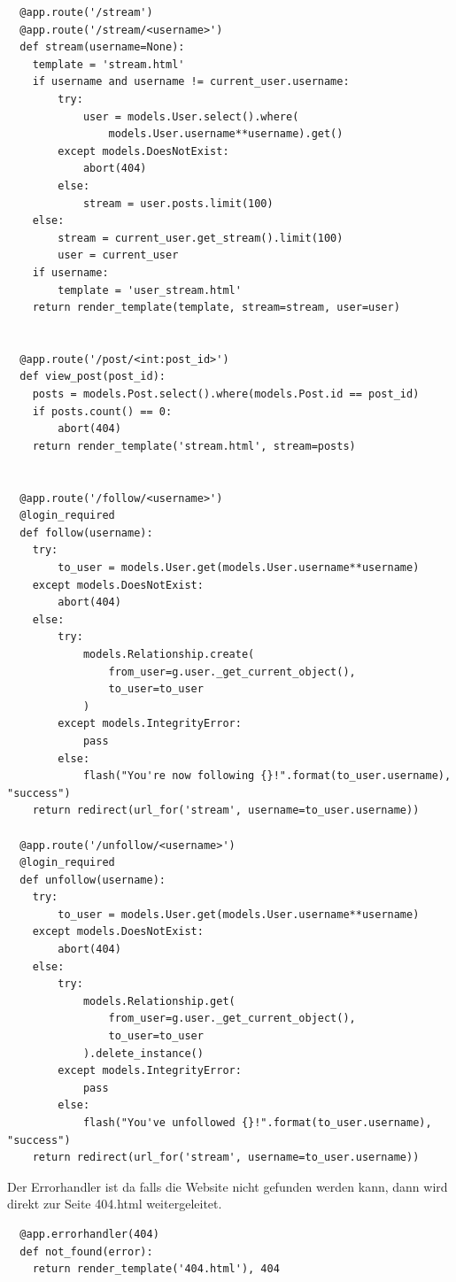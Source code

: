 \documentclass{article}
\begin{document}
\begin{lstlisting}
  @app.route('/stream')
  @app.route('/stream/<username>')
  def stream(username=None):
    template = 'stream.html'
    if username and username != current_user.username:
        try:
            user = models.User.select().where(
                models.User.username**username).get()
        except models.DoesNotExist:
            abort(404)
        else:
            stream = user.posts.limit(100)
    else:
        stream = current_user.get_stream().limit(100)
        user = current_user
    if username:
        template = 'user_stream.html'
    return render_template(template, stream=stream, user=user)


  @app.route('/post/<int:post_id>')
  def view_post(post_id):
    posts = models.Post.select().where(models.Post.id == post_id)
    if posts.count() == 0:
        abort(404)
    return render_template('stream.html', stream=posts)


  @app.route('/follow/<username>')
  @login_required
  def follow(username):
    try:
        to_user = models.User.get(models.User.username**username)
    except models.DoesNotExist:
        abort(404)
    else:
        try:
            models.Relationship.create(
                from_user=g.user._get_current_object(),
                to_user=to_user
            )
        except models.IntegrityError:
            pass
        else:
            flash("You're now following {}!".format(to_user.username), "success")
    return redirect(url_for('stream', username=to_user.username))

  @app.route('/unfollow/<username>')
  @login_required
  def unfollow(username):
    try:
        to_user = models.User.get(models.User.username**username)
    except models.DoesNotExist:
        abort(404)
    else:
        try:
            models.Relationship.get(
                from_user=g.user._get_current_object(),
                to_user=to_user
            ).delete_instance()
        except models.IntegrityError:
            pass
        else:
            flash("You've unfollowed {}!".format(to_user.username), "success")
    return redirect(url_for('stream', username=to_user.username))
\end{lstlisting}




Der Errorhandler ist da falls die Website nicht gefunden werden kann,
dann wird direkt zur Seite 404.html weitergeleitet.
\begin{lstlisting}
  @app.errorhandler(404)
  def not_found(error):
    return render_template('404.html'), 404

\end{lstlisting}
\end{document}
